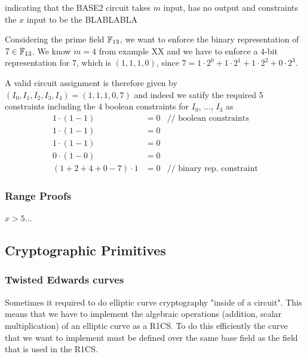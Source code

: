 \begin{center}
\end{center}
indicating that the BASE2 circuit takes $m$ input, has no output and constraints the $x$ input to be the BLABLABLA
\begin{example} Considering the prime field $\mathbb{F}_{13}$, we want to enforce the binary representation of $7\in \mathbb{F}_{13}$. We know $m=4$ from example XX and we have to enforce a $4$-bit representation for $7$, which is $(1,1,1,0)$, since $7= 1\cdot 2^0 + 1\cdot 2^1 + 1\cdot 2^2 + 0\cdot 2^3$.

A valid circuit assignment is therefore given by $(I_0,I_1,I_2,I_3,I_4)=(1,1,1,0,7)$ and indeed we satify the required 5 constraints including the $4$ boolean constraints for $I_0$, $\ldots$, $I_3$ as 
\begin{align*}
1\cdot (1-1) &= 0 & \text{// boolean constraints}\\
1\cdot (1-1) &= 0 \\
1\cdot (1-1) &= 0 \\
0\cdot (1-0) &= 0  \\
(1 + 2 + 4 + 0 -7)\cdot 1 &= 0  & \text{// binary rep. constraint}
\end{align*}
\end{example}

\subsubsection{Range Proofs}
$x>5$...


\subsection{Cryptographic Primitives}
\subsubsection{Twisted Edwards curves}
Sometimes it required to do elliptic curve cryptography "inside of a circuit". This means that we have to implement the algebraic operations (addition, scalar multiplication) of an elliptic curve as a R1CS. To do this efficiently the curve that we want to implement must be defined over the same base field as the field that is used in the R1CS. 

